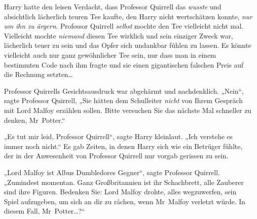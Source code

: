 Harry hatte den leisen Verdacht, dass Professor Quirrell das \emph{wusste} und absichtlich lächerlich teuren Tee kaufte, den Harry nicht wertschätzen konnte, \emph{nur um ihn zu ärgern}. Professor Quirrell \emph{selbst} mochte den Tee vielleicht nicht mal. Vielleicht mochte \emph{niemand} diesen Tee wirklich und sein einziger Zweck war, lächerlich teuer zu sein und das Opfer sich undankbar fühlen zu lassen. Es könnte vielleicht auch nur ganz gewöhnlicher Tee sein, nur dass man in einem bestimmten Code nach ihm fragte und sie einen gigantischen falschen Preis auf die Rechnung setzten…

Professor Quirrells Gesichtsausdruck war abgehärmt und nachdenklich. „Nein“, sagte Professor Quirrell, „Sie hätten dem Schulleiter \emph{nicht} von Ihrem Gespräch mit Lord Malfoy erzählen sollen. Bitte versuchen Sie das nächste Mal schneller zu denken, Mr~Potter.“

„Es tut mir leid, Professor Quirrell“, sagte Harry kleinlaut. „Ich verstehe es immer noch nicht.“ Es gab Zeiten, in denen Harry sich wie ein Betrüger fühlte, der in der Anwesenheit von Professor Quirrell nur vorgab gerissen zu sein.

„Lord Malfoy ist Albus Dumbledores Gegner“, sagte Professor Quirrell. „Zumindest momentan. Ganz Großbritannien ist ihr Schachbrett, alle Zauberer sind ihre Figuren. Bedenken Sie: Lord Malfoy drohte, alles wegzuwerfen, sein Spiel aufzugeben, um sich an dir zu rächen, wenn Mr~Malfoy verletzt würde. In diesem Fall, Mr~Potter…?“

